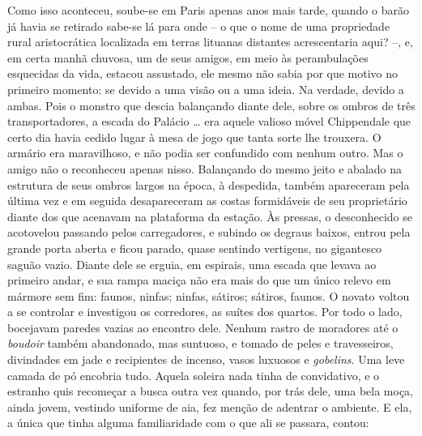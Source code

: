 Como isso aconteceu, soube-se em Paris apenas anos mais tarde, quando o
barão já havia se retirado sabe-se lá para onde -- o que o nome de uma
propriedade rural aristocrática localizada em terras lituanas distantes
acrescentaria aqui? --, e, em certa manhã chuvosa, um de seus amigos, em
meio às perambulações esquecidas da vida, estacou assustado, ele mesmo
não sabia por que motivo no primeiro momento: se devido a uma visão ou a
uma ideia. Na verdade, devido a ambas. Pois o monstro que descia
balançando diante dele, sobre os ombros de três transportadores, a
escada do Palácio \ldots{} era aquele valioso móvel Chippendale que certo
dia havia cedido lugar à mesa de jogo que tanta sorte lhe trouxera. O
armário era maravilhoso, e não podia ser confundido com nenhum outro.
Mas o amigo não o reconheceu apenas nisso. Balançando do mesmo jeito e
abalado na estrutura de seus ombros largos na época, à despedida, também
apareceram pela última vez e em seguida desapareceram as costas
formidáveis de seu proprietário diante dos que acenavam na plataforma da
estação. Às pressas, o desconhecido se acotovelou passando pelos
carregadores, e subindo os degraus baixos, entrou pela grande porta
aberta e ficou parado, quase sentindo vertigens, no gigantesco saguão
vazio. Diante dele se erguia, em espirais, uma escada que levava ao
primeiro andar, e sua rampa maciça não era mais do que um único relevo
em mármore sem fim: faunos, ninfas; ninfas, sátiros; sátiros, faunos. O
novato voltou a se controlar e investigou os corredores, as suítes dos
quartos. Por todo o lado, bocejavam paredes vazias ao encontro dele.
Nenhum rastro de moradores até o \emph{boudoir} também abandonado, mas
suntuoso, e tomado de peles e travesseiros, divindades em jade e
recipientes de incenso, vasos luxuosos e \emph{gobelins}. Uma leve
camada de pó encobria tudo. Aquela soleira nada tinha de convidativo, e
o estranho quis recomeçar a busca outra vez quando, por trás dele, uma
bela moça, ainda jovem, vestindo uniforme de aia, fez menção de adentrar
o ambiente. E ela, a única que tinha alguma familiaridade com o que ali
se passara, contou:

